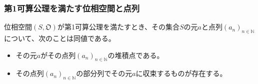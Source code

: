 \documentclass[dvipdfmx]{jsarticle}
\begin{document}
\subsubsection{第1可算公理を満たす位相空間と点列}%
\begin{thm}\label{8.1.10.1}
位相空間$\left( S,\mathfrak{O} \right)$が第1可算公理を満たすとき、その集合$S$の元$a$と点列$\left( a_{n} \right)_{n \in \mathbb{N}}$について、次のことは同値である。
\begin{itemize}
\item
  その元$a$がその点列$\left( a_{n} \right)_{n \in \mathbb{N}}$の堆積点である。
\item
  その点列$\left( a_{n} \right)_{n \in \mathbb{N}}$の部分列でその元$a$に収束するものが存在する。
\end{itemize}
\end{thm}
\end{document}
